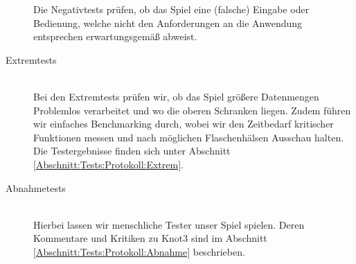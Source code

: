 \begin{description}
	Die Negativtests prüfen, ob das Spiel eine (falsche) Eingabe oder Bedienung, welche nicht den Anforderungen an die Anwendung entsprechen erwartungsgemäß abweist. \\
	
\clearpage
	
	
	\item[Extremtests] \hfill
	\\
	
	Bei den Extremtests prüfen wir, ob das Spiel  größere Datenmengen Problemlos verarbeitet und wo die oberen Schranken liegen. Zudem führen wir einfaches Benchmarking durch, wobei wir den Zeitbedarf kritischer Funktionen messen und nach möglichen Flaschenhälsen Ausschau halten. Die Testergebnisse finden sich unter Abschnitt \ref{Abschnitt:Tests:Protokoll:Extrem}.\\


	\item[Abnahmetests] \hfill
	\\
	
	Hierbei lassen wir menschliche Tester unser Spiel spielen. Deren Kommentare und Kritiken zu Knot3 sind im Abschnitt \ref{Abschnitt:Tests:Protokoll:Abnahme} beschrieben.\\
		
\end{description}







